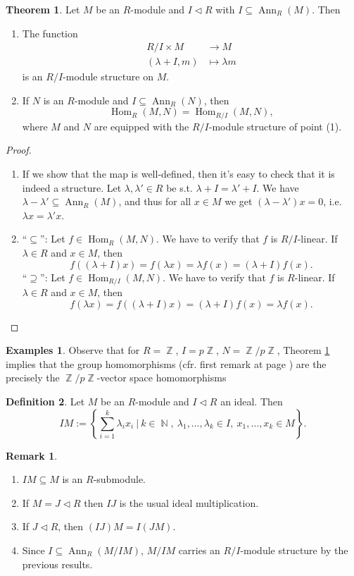 \documentclass[12pt,a4paper]{report}
\theoremstyle{definition}
\newtheorem{theorem}{Theorem}[chapter] %
\newtheorem{defn}[theorem]{Definition}
\newtheorem*{examples}{Examples}
\newtheorem*{remark}{Remark}
\theoremstyle{num.custom-title}
\DeclareMathOperator{\Hom}{Hom}
\DeclareMathOperator{\Ann}{Ann}
\DeclareMathOperator{\N}{\mathbb{N}}
\DeclareMathOperator{\Z}{\mathbb{Z}}
\DeclareMathOperator{\sse}{\subseteq}
\begin{document}
\begin{theorem}\label{thm-equiv-hom}
Let $M$ be an $R$-module and $I \lhd R$ with $I \sse \Ann_R(M)$. Then
\begin{enumerate}
\item The function
\begin{align*}
R/I \times M &\to M \\
(\lambda + I, m) &\mapsto \lambda m
\end{align*}
is an $R/I$-module structure on $M$.
\item If $N$ is an $R$-module and $I \sse \Ann_R(N)$, then
\[
\Hom_R(M,N) = \Hom_{R/I}(M,N),
\]
where $M$ and $N$ are equipped with the $R/I$-module structure of point (1).
\end{enumerate}
\begin{proof}\ 
\begin{enumerate}
\item If we show that the map is well-defined, then it's easy to check that it is indeed a structure. Let $\lambda,\lambda' \in R$ be s.t. $\lambda + I = \lambda' + I$. We have $\lambda - \lambda' \sse \Ann_R(M)$, and thus for all $x \in M$ we get $(\lambda-\lambda')x=0$, i.e. $\lambda x = \lambda' x$.
\item ``$\sse$'': Let $f \in \Hom_R(M,N)$. We have to verify that $f$ is $R/I$-linear. If $\lambda \in R$ and $x \in M$, then
\[
f((\lambda + I)x) = f(\lambda x) = \lambda f(x) = (\lambda + I) f(x).
\]
``$\supseteq$'': Let $f \in \Hom_{R/I}(M,N)$. We have to verify that $f$ is $R$-linear. If $\lambda \in R$ and $x \in M$, then
\[
f(\lambda x) = f((\lambda + I)x) = (\lambda + I) f(x) = \lambda f(x).
\]
\end{enumerate}
\end{proof}
\end{theorem}

\begin{examples}
Observe that for $R=\Z$, $I=p\Z$, $N=\Z/p\Z$, Theorem \ref{thm-equiv-hom} implies that the group homomorphisms (cfr. first remark at page \pageref{Z-hom=goup_hom}) are the precisely the $\Z/p\Z$-vector space homomorphisms
\end{examples}

\begin{defn}
Let $M$ be an $R$-module and $I \lhd R$ an ideal. Then
\[
IM := \left\{ \sum_{i=1}^k \lambda_i x_i \ \Bigg| \ k \in \N, \ \lambda_1,\ldots,\lambda_k \in I, \ x_1,\ldots,x_k \in M \right\}.
\]
\end{defn}

\begin{remark}\ 
\begin{enumerate}
\item $IM \sse M$ is an $R$-submodule.
\item If $M=J \lhd R$ then $IJ$ is the usual ideal multiplication.
\item If $J \lhd R$, then $(IJ)M=I(JM)$.
\item Since $I \sse \Ann_R(M/IM)$, $M/IM$ carries an $R/I$-module structure by the previous results.
\end{enumerate}
\end{remark}
\end{document}
